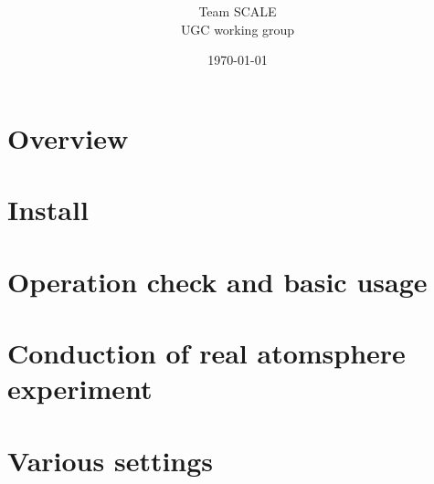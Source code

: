 \documentclass[a4paper]{report}
\title{{\vspace{2cm}{\Large Version \version} }}
\author{\Large Team SCALE\\ UGC working group}
\date{\today}
\begin{document}
\maketitle
\ClearWallPaper
{}
\tableofcontents

\chapter{Overview} \label{chap:overview}



\chapter{Install} \label{chap:install}


\chapter{Operation check and basic usage} \label{chap:tutorial_ideal}





\chapter{Conduction of real atomsphere experiment} \label{chap:tutorial_real}








\chapter{Various settings} \label{chap:basic_usel}





\clearpage















\end{document}
